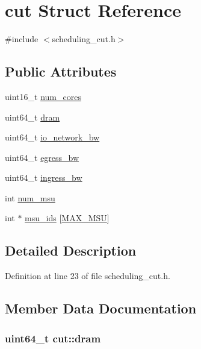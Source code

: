 \hypertarget{structcut}{\section{cut Struct Reference}
\label{structcut}
}


{\ttfamily \#include $<$scheduling\-\_\-cut.\-h$>$}

\subsection*{Public Attributes}
\begin{DoxyCompactItemize}
\item 
uint16\-\_\-t \hyperlink{structcut_a698d9917bec501d6a3f14cba141b03ae}{num\-\_\-cores}
\item 
uint64\-\_\-t \hyperlink{structcut_a483bf993496f8816ec0870711a9c2c4a}{dram}
\item 
uint64\-\_\-t \hyperlink{structcut_a3c0344ad7e8725763aebacac3632b0a6}{io\-\_\-network\-\_\-bw}
\item 
uint64\-\_\-t \hyperlink{structcut_a8d676e103e1e29912c606f34ab34c5cf}{egress\-\_\-bw}
\item 
uint64\-\_\-t \hyperlink{structcut_a3fbcce011fd7ee1410f7fbf2fa27f293}{ingress\-\_\-bw}
\item 
int \hyperlink{structcut_ae96cd38e08c0b4514e75210a12ee17ae}{num\-\_\-msu}
\item 
int $\ast$ \hyperlink{structcut_abdfeb0b19bcc94fc210767f519777a3f}{msu\-\_\-ids} \mbox{[}\hyperlink{dfg_8h_ae4dc3586073212cd441edfe4134132f3}{M\-A\-X\-\_\-\-M\-S\-U}\mbox{]}
\end{DoxyCompactItemize}


\subsection{Detailed Description}


Definition at line 23 of file scheduling\-\_\-cut.\-h.



\subsection{Member Data Documentation}
\hypertarget{structcut_a483bf993496f8816ec0870711a9c2c4a}{
\subsubsection[{dram}]{\setlength{\rightskip}{0pt plus 5cm}uint64\-\_\-t cut\-::dram}}\label{structcut_a483bf993496f8816ec0870711a9c2c4a}


